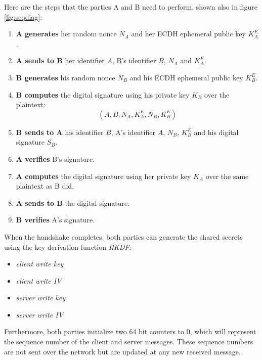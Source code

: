 Here are the steps that the parties A and B need to perform, shown also in figure
\ref{fig:seqdiag}:
\begin{enumerate}
    \item \textbf{A generates} her random nonce $N_A$ and her ECDH ephemeral public key $K^E_A$.
    \item \textbf{A sends to B} her identifier $A$, B's identifier $B$, $N_A$ and $K^E_A$.
    \item \textbf{B generates} his random nonce $N_B$ and his ECDH ephemeral public key $K^E_B$.
    \item \textbf{B computes} the digital signature using his private key $K_B$ over the plaintext:
    \begin{equation*}
            (A,B,N_A,K^E_A,N_B,K^E_B)
    \end{equation*}
    \item \textbf{B sends to A} his identifier $B$, A's identifier $A$, $N_B$, $K^E_B$ and his digital signature $S_B$.
    \item \textbf{A verifies} B's signature.
    \item \textbf{A computes} the digital signature using her private key $K_A$ over the same plaintext as B did.
    \item \textbf{A sends to B} the digital signature.
    \item \textbf{B verifies} A's signature.
\end{enumerate}

When the handshake completes, both parties can generate the shared secrets 
using the key derivation function \emph{HKDF}:
\begin{itemize}
    \item \emph{client write key}
    \item \emph{client write IV}
    \item \emph{server write key}
    \item \emph{server write IV}
\end{itemize}

Furthermore, both parties initialize two 64 bit counters to 0, which will 
represent the sequence number of the client and server messages. These sequence
numbers are not sent over the network but are updated at any new received
message.

